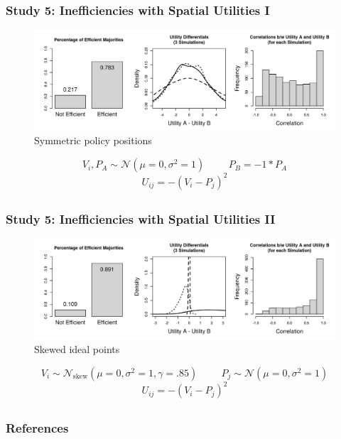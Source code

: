 \documentclass{beamer}
\begin{document}
\subsection{}
\begin{frame}%
  \frametitle{Study 5: Inefficiencies with Spatial Utilities I}
  \begin{figure}[ht]\centering
    \includegraphics[width=\textwidth]{../simulations/fig/sX2.png}
    \caption{Symmetric policy positions}
  \end{figure}
	$$ V_i,P_{A} \sim \mathcal{N}(\mu=0,\sigma^2=1) \hspace{1cm} P_{B} = -1*P_{A} $$
	$$ U_{ij} = -(V_i - P_j)^2 $$
\end{frame}
\subsection{}
\begin{frame}%
  \frametitle{Study 5: Inefficiencies with Spatial Utilities II}
  \begin{figure}[ht]\centering
    \includegraphics[width=\textwidth]{../simulations/fig/sX1.png}
    \caption{Skewed ideal points}
  \end{figure}
	$$ V_i \sim \mathcal{N}_\text{skew}(\mu=0,\sigma^2=1,\gamma=.85) \hspace{1cm} P_j \sim \mathcal{N}(\mu=0,\sigma^2=1) $$
	$$ U_{ij} = -(V_i - P_j)^2 $$
\end{frame}

\subsection{}
\begin{frame}
  \frametitle{References}
  \def\newblock{\hskip .11em plus .33em minus .07em}
  \begin{scriptsize}
    
    
  \end{scriptsize}
\end{frame}
\end{document}
